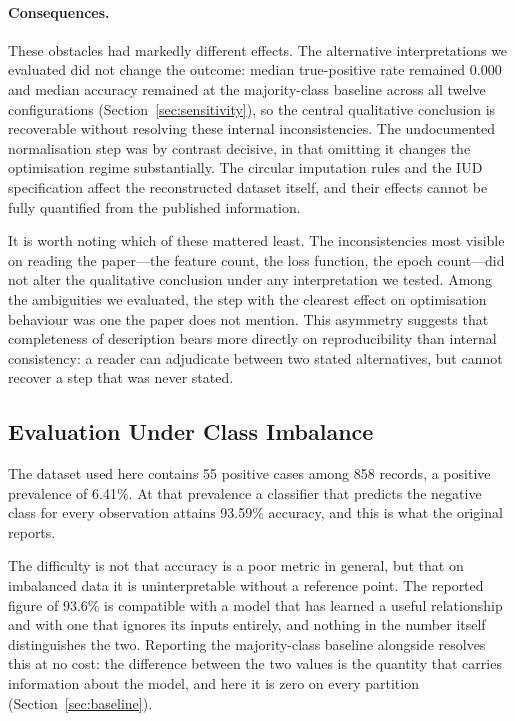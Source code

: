 \paragraph{Consequences.} These obstacles had markedly different effects. The
alternative interpretations we evaluated did not change the outcome: median
true-positive rate remained $0.000$ and median accuracy remained at the
majority-class baseline across all twelve configurations
(Section~\ref{sec:sensitivity}), so the central qualitative conclusion is
recoverable without resolving these internal inconsistencies. The undocumented
normalisation step was by contrast decisive, in that omitting it changes the
optimisation regime substantially. The circular imputation rules and the IUD
specification affect the reconstructed dataset itself, and their effects cannot
be fully quantified from the published information.

It is worth noting which of these mattered least. The inconsistencies most
visible on reading the paper---the feature count, the loss function, the epoch
count---did not alter the qualitative conclusion under any interpretation we
tested. Among the ambiguities we evaluated, the step with the clearest effect
on optimisation behaviour was one the paper does not mention. This asymmetry
suggests that completeness of description bears more directly on
reproducibility than internal consistency: a reader can adjudicate between two
stated alternatives, but cannot recover a step that was never stated.

\subsection{Evaluation Under Class Imbalance}\label{sec:imbalance}

The dataset used here contains 55 positive cases among 858 records, a positive
prevalence of 6.41\%. At that prevalence a classifier that predicts the
negative class for every observation attains 93.59\% accuracy, and this is what
the original reports.

The difficulty is not that accuracy is a poor metric in general, but that on
imbalanced data it is uninterpretable without a reference point. The reported
figure of 93.6\% is compatible with a model that has learned a useful
relationship and with one that ignores its inputs entirely, and nothing in the
number itself distinguishes the two. Reporting the majority-class baseline
alongside resolves this at no cost: the difference between the two values is
the quantity that carries information about the model, and here it is zero on
every partition (Section~\ref{sec:baseline}).

